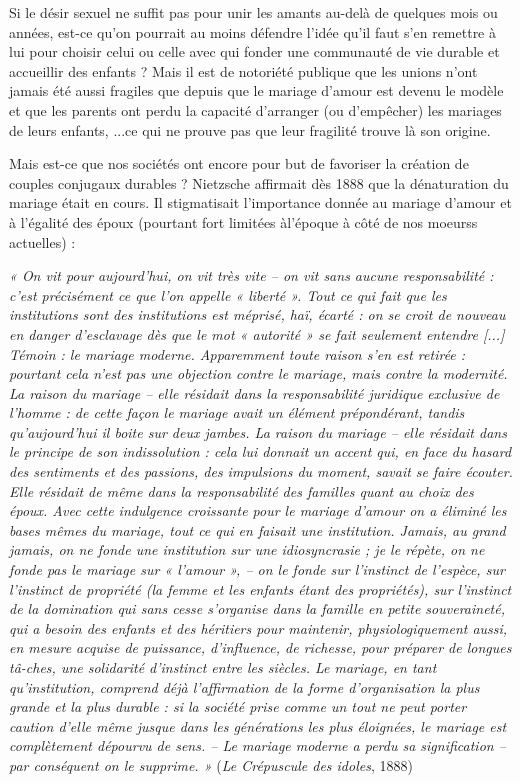 Si le désir sexuel ne suffit pas pour unir les amants au-delà de quelques mois ou années, est-ce qu'on pourrait au moins défendre l'idée qu'il faut s'en remettre à lui pour choisir celui ou celle avec qui fonder une communauté de vie durable et accueillir des enfants ? Mais il est de notoriété publique que les unions n'ont jamais été aussi fragiles que depuis que le mariage d’amour est devenu le modèle et que les parents ont perdu la capacité d’arranger (ou d'empêcher) les mariages de leurs enfants, ...ce qui ne prouve pas que leur fragilité trouve là son origine.


Mais est-ce que nos sociétés ont encore pour but de favoriser la création de couples conjugaux durables ? Nietzsche affirmait dès 1888 que la dénaturation du mariage était en cours. Il stigmatisait l'importance donnée au mariage d'amour et à l'égalité des époux (pourtant fort limitées àl'époque à côté de nos moeurss actuelles) :
\begin{displayquote}
\emph{« On vit pour aujourd'hui, on vit très vite -- on vit sans aucune responsabilité : c'est précisément ce que l'on appelle « liberté ». Tout ce qui fait que les institutions sont des institutions est méprisé, haï, écarté : on se croit de nouveau en danger d'esclavage dès que le mot « autorité » se fait seulement entendre [...] Témoin : le mariage moderne. Apparemment toute raison s'en est retirée : pourtant cela n'est pas une objection contre le mariage, mais contre la modernité. La raison du mariage -- elle résidait dans la responsabilité juridique exclusive de l'homme : de cette façon le mariage avait un élément prépondérant, tandis qu'aujourd'hui il boite sur deux jambes. La raison du mariage -- elle résidait dans le principe de son indissolution : cela lui donnait un accent qui, en face du hasard des sentiments et des passions, des impulsions du moment, savait se faire écouter. Elle résidait de même dans la responsabilité des familles quant au choix des époux. Avec cette indulgence croissante pour le mariage d'amour on a éliminé les bases mêmes du mariage, tout ce qui en faisait une institution. Jamais, au grand jamais, on ne fonde une institution sur une idiosyncrasie ; je le répète, on ne fonde pas le mariage sur « l'amour », -- on le fonde sur l'instinct de l'espèce, sur l'instinct de propriété (la femme et les enfants étant des propriétés), sur l'instinct de la domination qui sans cesse s'organise dans la famille en petite souveraineté, qui a besoin des enfants et des héritiers pour maintenir, physiologiquement aussi, en mesure acquise de puissance, d'influence, de richesse, pour préparer de longues tâ-ches, une solidarité d'instinct entre les siècles. Le mariage, en tant qu'institution, comprend déjà l'affirmation de la forme d'organisation la plus grande et la plus durable : si la société prise comme un tout ne peut porter caution d'elle même jusque dans les générations les plus éloignées, le mariage est complètement dépourvu de sens. -- Le mariage moderne a perdu sa signification -- par conséquent on le supprime. »} (\emph{Le Crépuscule des idoles}, 1888) 
\end{displayquote}

